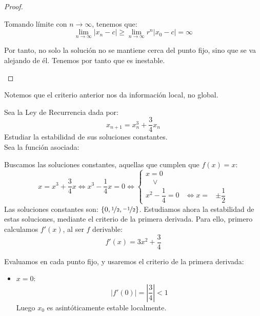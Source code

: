 \begin{proof}
\begin{itemize}
        Tomando límite con $n\to \infty$, tenemos que:
        \begin{equation*}
            \lim_{n\to \infty} |x_n-c| \geq \lim_{n\to \infty}r^n|x_0-c| = \infty
        \end{equation*}

        Por tanto, no solo la solución no se mantiene cerca del punto fijo, sino que se va alejando de él. Tenemos por tanto que es inestable.
    \end{itemize}
\end{proof}

Notemos que el criterio anterior nos da información local, no global.

\begin{ejemplo}
    Sea la Ley de Recurrencia dada por:
    \begin{equation*}
        x_{n+1} = x_n^3 + \dfrac{3}{4}x_n
    \end{equation*}
    Estudiar la estabilidad de sus soluciones constantes.\\
    
    Sea la función asociada:

    Buscamos las soluciones constantes, aquellas que cumplen que $f(x) = x$:
    \begin{equation*}
        x = x^3 + \dfrac{3}{4}x \Longleftrightarrow x^3 -\dfrac{1}{4}x = 0 \Longleftrightarrow \left\{ \begin{array}{lll} 
        x = 0 & & \\
        \quad \lor& & \\
        x^2 -\dfrac{1}{4} = 0 & \Longleftrightarrow x = & \pm \dfrac{1}{2} 
        \end{array}\right.
    \end{equation*}
    Las soluciones constantes son: $\left\{0, \nicefrac{1}{2}, \nicefrac{-1}{2}\right\}$. Estudiamos ahora la estabilidad de estas soluciones, mediante el criterio de la primera derivada. Para ello, primero calculamos $f'(x)$, al ser $f$ derivable:
    \begin{equation*}
        f'(x) = 3x^2 + \dfrac{3}{4}
    \end{equation*}

    Evaluamos en cada punto fijo, y usaremos el criterio de la primera derivada:
    \begin{itemize}
        \item \ul{$x = 0$}:
        \begin{equation*}
            |f'(0)| = \left|\dfrac{3}{4}\right| < 1
        \end{equation*}
        Luego $x_0$ es asintóticamente estable localmente.


\end{itemize}
\end{ejemplo}
